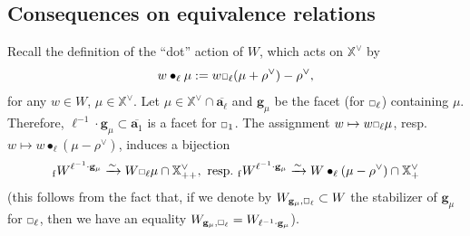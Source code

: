 \documentclass[11pt]{amsart}
\theoremstyle{plain}
\theoremstyle{remark}
\newcommand{\car}{\mbox{\relsize{-5}$\Box$}}
\numberwithin{equation}{section}
\begin{document}
	\subsection{Consequences on equivalence relations}\label{Consequences on equivalence relations}
			Recall the definition of the ``dot'' action of $W$, which acts on $\mathbb{X}^\vee$ by $$w\bullet_{\ell}\mu:=w\car_\ell (\mu+\rho^\vee)-\rho^\vee,$$ for any $w\in W$, $\mu\in\mathbb{X}^\vee$. Let $\mu\in\mathbb{X}^\vee\cap\overline{\mathbf{a}_\ell}$ and $\mathbf{g}_\mu$ be the facet (for $\car_\ell$) containing $\mu$. Therefore, $\ell^{-1}\cdot\mathbf{g}_\mu\subset\overline{\mathbf{a}_1}$ is a facet for $\car_1$. The assignment $w\mapsto w\car_\ell\mu$, resp. $w\mapsto w\bullet_\ell(\mu-\rho^\vee)$, induces a bijection 
	\begin{equation}\label{param dom weights}
	    {_\mathrm{f}W}^{\ell^{-1}\cdot\mathbf{g}_{\mu}}\xrightarrow{\sim}W\car_\ell\mu\cap\mathbb{X}^\vee_{++}, ~\text{resp.}~{_\mathrm{f}W}^{\ell^{-1}\cdot\mathbf{g}_\mu}\xrightarrow{\sim}W\bullet_\ell(\mu-\rho^\vee)\cap\mathbb{X}^\vee_{+}
	\end{equation} 
	(this follows from the fact that, if we denote by $W_{\mathbf{g}_\mu,\car_\ell}\subset W$ the stabilizer of $\mathbf{g}_\mu$ for $\car_\ell$, then we have an equality $W_{\mathbf{g}_\mu,\car_\ell}=W_{\ell^{-1}\cdot\mathbf{g}_\mu}$).
	
\end{document}

